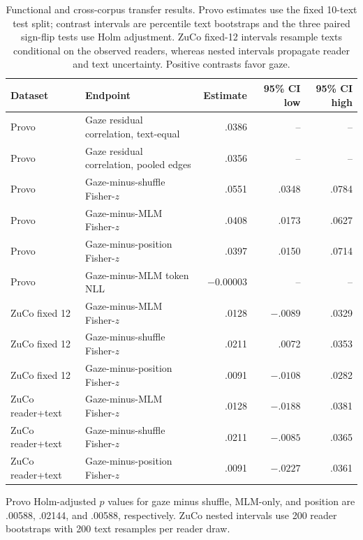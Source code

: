 \begin{table}[tbp]
\centering
\caption{Functional and cross-corpus transfer results. Provo estimates use the fixed 10-text test split; contrast intervals are percentile text bootstraps and the three paired sign-flip tests use Holm adjustment. ZuCo fixed-12 intervals resample texts conditional on the observed readers, whereas nested intervals propagate reader and text uncertainty. Positive contrasts favor gaze.}
\label{tab:functional}
\small
\begin{tabularx}{\linewidth}{lYrrr}
\toprule
Dataset & Endpoint & Estimate & 95\% CI low & 95\% CI high \\
\midrule
Provo & Gaze residual correlation, text-equal & .0386 & -- & -- \\
Provo & Gaze residual correlation, pooled edges & .0356 & -- & -- \\
Provo & Gaze-minus-shuffle Fisher-$z$ & .0551 & .0348 & .0784 \\
Provo & Gaze-minus-MLM Fisher-$z$ & .0408 & .0173 & .0627 \\
Provo & Gaze-minus-position Fisher-$z$ & .0397 & .0150 & .0714 \\
Provo & Gaze-minus-MLM token NLL & $-0.00003$ & -- & -- \\
ZuCo fixed 12 & Gaze-minus-MLM Fisher-$z$ & .0128 & $-.0089$ & .0329 \\
ZuCo fixed 12 & Gaze-minus-shuffle Fisher-$z$ & .0211 & .0072 & .0353 \\
ZuCo fixed 12 & Gaze-minus-position Fisher-$z$ & .0091 & $-.0108$ & .0282 \\
ZuCo reader+text & Gaze-minus-MLM Fisher-$z$ & .0128 & $-.0188$ & .0381 \\
ZuCo reader+text & Gaze-minus-shuffle Fisher-$z$ & .0211 & $-.0085$ & .0365 \\
ZuCo reader+text & Gaze-minus-position Fisher-$z$ & .0091 & $-.0227$ & .0361 \\
\bottomrule
\end{tabularx}
\begin{minipage}{0.95\linewidth}\small
Provo Holm-adjusted $p$ values for gaze minus shuffle, MLM-only, and position are .00588, .02144, and .00588, respectively. ZuCo nested intervals use 200 reader bootstraps with 200 text resamples per reader draw.
\end{minipage}
\end{table}
